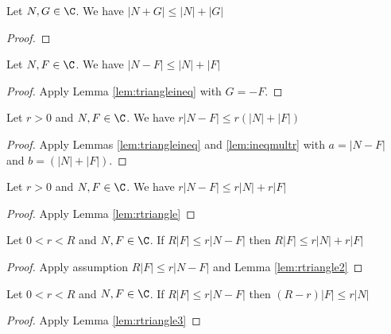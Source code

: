 \begin{lemma} \label{lem:triangleineq}  \leanok
Let $N,G\in\C$. We have $|N + G| \le |N| + |G|$
\end{lemma}
\begin{proof} \leanok
\end{proof}

\begin{lemma} \label{lem:triangleineqminus}  \leanok
Let $N,F\in\C$. We have $|N - F| \le |N| + |F|$
\end{lemma}
\begin{proof} \leanok {}
Apply Lemma \ref{lem:triangleineq} with $G=-F$.
\end{proof}


\begin{lemma}\label{lem:rtriangle}  \leanok
Let $r>0$ and $N,F\in\C$. We have $r|N - F| \le r(|N| + |F|)$
\end{lemma}
\begin{proof} \leanok {}
Apply Lemmas \ref{lem:triangleineq} and \ref{lem:ineqmultr} with $a=|N-F|$ and $b=(|N| + |F|)$.
\end{proof}

\begin{lemma}\label{lem:rtriangle2}  \leanok
Let $r>0$ and $N,F\in\C$. We have $r|N - F| \le r|N| + r|F|$
\end{lemma}
\begin{proof} \leanok {}
Apply Lemma \ref{lem:rtriangle}
\end{proof}

\begin{lemma}\label{lem:rtriangle3}  \leanok
Let $0<r<R$ and $N,F\in\C$. If $R|F| \le r|N-F|$ then $R|F| \le r|N| + r|F|$
\end{lemma}
\begin{proof} \leanok {}
Apply assumption $R|F| \le r|N-F|$ and Lemma \ref{lem:rtriangle2}
\end{proof}

\begin{lemma} \label{lem:rtriangle4}  \leanok
Let $0<r<R$ and $N,F\in\C$. If $R|F| \le r|N-F|$ then $(R-r)|F| \le r|N|$
\end{lemma}
\begin{proof} \leanok {}
Apply Lemma \ref{lem:rtriangle3}
\end{proof}

